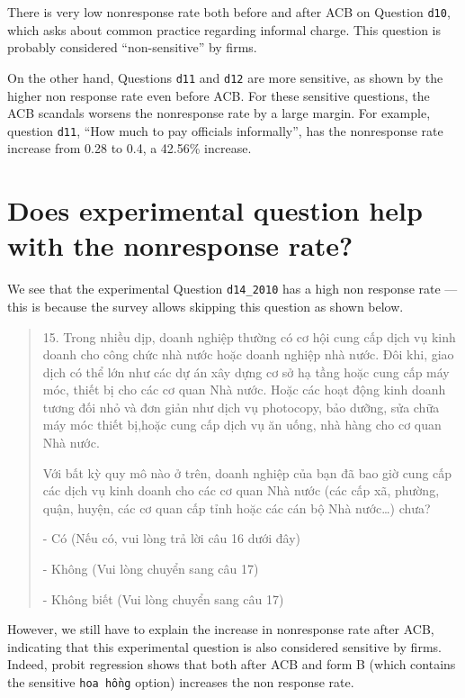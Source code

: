 \documentclass{article}\usepackage[]{graphicx}\usepackage[]{color}
\begin{document}
There is very low nonresponse rate both before and after ACB on Question \verb`d10`, which asks about common practice regarding informal charge. This question is probably considered ``non-sensitive'' by firms. 

On the other hand, Questions \verb`d11` and \verb`d12` are more sensitive, as shown by the higher non response rate even before ACB. For these sensitive questions, the ACB scandals worsens the nonresponse rate by a large margin. For example, question \verb`d11`, ``How much to pay officials informally'', has the nonresponse rate increase from 0.28 to 0.4, a 42.56\% increase.

\section{Does experimental question help with the nonresponse rate?}
We see that the experimental Question \verb`d14_2010` has a high non response rate --- this is because the survey allows skipping this question as shown below.

\begin{quote}
15. Trong nhiều dịp, doanh nghiệp thường có cơ hội cung cấp dịch vụ kinh doanh cho công chức nhà nước hoặc doanh nghiệp nhà nước. Đôi khi, giao dịch có thể lớn như các dự án xây dựng cơ sở hạ tầng hoặc cung cấp máy móc, thiết bị cho các cơ quan Nhà nước. Hoặc các hoạt động kinh doanh tương đối nhỏ và đơn giản như dịch vụ photocopy, bảo dưỡng, sửa chữa máy móc thiết bị,hoặc cung cấp dịch vụ ăn uống, nhà hàng cho cơ quan Nhà nước.

Với bất kỳ quy mô nào ở trên, doanh nghiệp của bạn đã bao giờ cung cấp các dịch vụ kinh doanh cho các cơ quan Nhà nước (các cấp xã, phường, quận, huyện, các cơ quan cấp tỉnh hoặc các cán bộ Nhà nước…) chưa? 

{\color{red}- Có (Nếu có, vui lòng trả lời câu 16 dưới đây)

- Không (Vui lòng chuyển sang câu 17)

- Không biết (Vui lòng chuyển sang câu 17)}
\end{quote}

However, we still have to explain the increase in nonresponse rate after ACB, indicating that this experimental question is also considered sensitive by firms. Indeed, probit regression shows that both after ACB and form B (which contains the sensitive \verb`hoa hồng` option) increases the non response rate.
\end{document}
